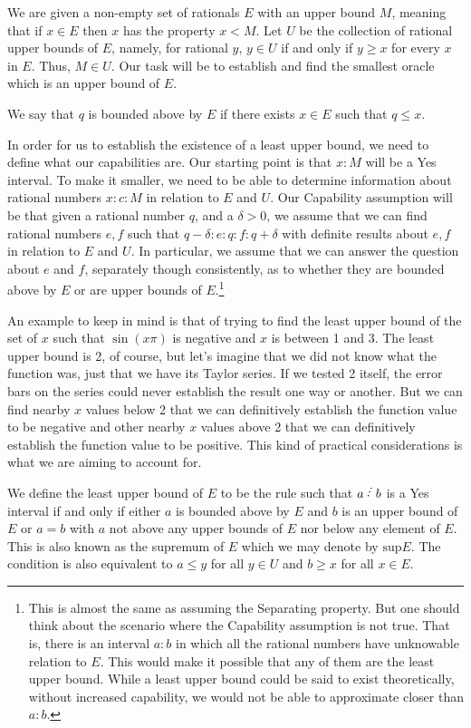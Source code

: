 \documentclass[12pt]{article}
\begin{document}
We are given a non-empty set of rationals $E$ with an upper bound $M$, meaning that if $x \in E$ then $x$ has the property $x < M$. Let $U$ be the collection of rational upper bounds of $E$, namely, for rational $y$, $y \in U$ if and only if $y \geq x$ for every $x$ in $E$.  Thus, $M \in U$. Our task will be to establish and find the smallest oracle which is an upper bound of $E$.

We say that $q$ is bounded above by $E$ if there exists $x \in E$ such that $q \leq x$.

In order for us to establish the existence of a least upper bound, we need to define what our capabilities are. Our starting point is that $x:M$ will be a Yes interval. To make it smaller, we need to be able to determine information about rational numbers $x:c:M$ in relation to $E$ and $U$. Our Capability assumption will be that given a rational number $q$, and a $\delta > 0$, we assume that we can find rational numbers $e,f$  such that $q-\delta:e:q:f:q+\delta$ with definite results about $e,f$ in relation to $E$ and $U$. In particular, we assume that we can answer the question about $e$ and $f$, separately though consistently, as to whether they are bounded above by $E$ or are upper bounds of $E$.\footnote{This is almost the same as assuming the Separating property. But one should think about the scenario where the Capability assumption is not true. That is, there is an interval $a:b$ in which all the rational numbers have unknowable relation to $E$. This would make it possible that any of them are the least upper bound. While a least upper bound could be said to exist theoretically, without increased capability, we would not be able to approximate closer than $a:b$.} 

An example to keep in mind is that of trying to find the least upper bound of the set of $x$ such that $\sin(x \pi)$ is negative and $x$ is between 1 and 3. The least upper bound is 2, of course, but let's imagine that we did not know what the function was, just that we have its Taylor series. If we tested 2 itself, the error bars on the series could never establish the result one way or another. But we can find nearby $x$ values below 2 that we can definitively establish the function value to be negative and other nearby $x$ values above 2 that we can definitively establish the function value to be positive. This kind of practical considerations is what we are aiming to account for. 

We define the least upper bound of $E$ to be the rule such that $a\lte b$ is a Yes interval if and only if either $a$ is bounded above by $E$ and $b$ is an upper bound of $E$ or $a=b$ with $a$ not above any upper bounds of $E$ nor below any element of $E$. This is also known as the supremum of $E$ which we may denote by $\mathrm{sup} E$. The condition is also equivalent to $a \leq y$ for all $y \in U$ and $b \geq x$ for all $x \in E$.
\end{document}
